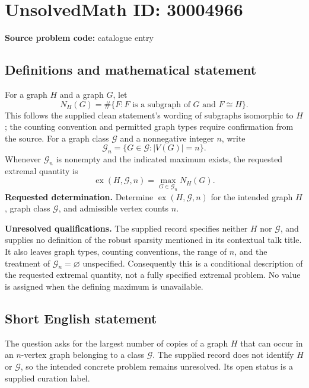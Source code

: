\documentclass[11pt]{article}
\begin{document}
\section*{UnsolvedMath ID: 30004966}
\textbf{Source problem code:} catalogue entry
\subsection{Definitions and mathematical statement}
For a graph \(H\) and a graph \(G\), let
\[
N_H(G)=\#\{F:F\text{ is a subgraph of }G\text{ and }F\cong H\}.
\]
This follows the supplied clean statement's wording of subgraphs isomorphic to \(H\); the counting convention and permitted graph types require confirmation from the source. For a graph class \(\mathcal G\) and a nonnegative integer \(n\), write
\[
\mathcal G_n=\{G\in\mathcal G:|V(G)|=n\}.
\]
Whenever \(\mathcal G_n\) is nonempty and the indicated maximum exists, the requested extremal quantity is
\[
\operatorname{ex}(H,\mathcal G,n)
=\max_{G\in\mathcal G_n}N_H(G).
\]
\textbf{Requested determination.} Determine \(\operatorname{ex}(H,\mathcal G,n)\) for the intended graph \(H\), graph class \(\mathcal G\), and admissible vertex counts \(n\).

\textbf{Unresolved qualifications.} The supplied record specifies neither \(H\) nor \(\mathcal G\), and supplies no definition of the robust sparsity mentioned in its contextual talk title. It also leaves graph types, counting conventions, the range of \(n\), and the treatment of \(\mathcal G_n=\varnothing\) unspecified. Consequently this is a conditional description of the requested extremal quantity, not a fully specified extremal problem. No value is assigned when the defining maximum is unavailable.
\subsection{Short English statement}
The question asks for the largest number of copies of a graph \(H\) that can occur in an \(n\)-vertex graph belonging to a class \(\mathcal G\). The supplied record does not identify \(H\) or \(\mathcal G\), so the intended concrete problem remains unresolved. Its open status is a supplied curation label.
\end{document}

